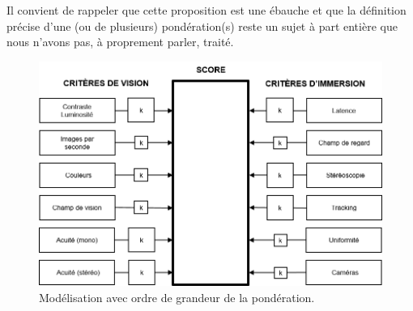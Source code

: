 \par Il convient de rappeler que cette proposition est une ébauche et que la définition précise d'une (ou de plusieurs) pondération(s) reste un sujet à part entière que nous n'avons pas, à proprement parler, traité.

\begin{figure}
	\centering
	\includegraphics[scale=1]{Figures/ModeleDefinitifPondere}
	\caption{Modélisation avec ordre de grandeur de la pondération.}
	\label{fig:modèle_définitif_pondere}
\end{figure}